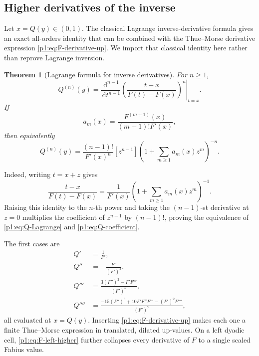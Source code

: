 \documentclass[11pt,oneside]{article}
\newtheorem{theorem}{Theorem}[section]
\theoremstyle{definition}
\theoremstyle{remark}
\newcommand{\dd}{\,\mathrm d}
\newcommand{\1}{\mathbf 1}
\begin{document}
\subsection{Higher derivatives of the inverse}
Let \(x=Q(y)\in(0,1)\).  The classical Lagrange inverse-derivative formula
\cite{p1:Comtet} gives an exact all-orders identity that can be combined with the
Thue--Morse derivative expression \eqref{p1:eq:F-derivative-up}.  We import that
classical identity here rather than reprove Lagrange inversion.

\begin{theorem}[Lagrange formula for inverse derivatives]\label{p1:thm:Q-derivatives}
For \(n\geq1\),
\begin{equation}
 \boxed{\quad
 Q^{(n)}(y)=
 \left.\frac{\dd^{n-1}}{\dd t^{n-1}}
 \left(\frac{t-x}{F(t)-F(x)}\right)^n\right|_{t=x}.
 \quad}                                                        \label{p1:eq:Q-Lagrange}
\end{equation}
If
\begin{equation}
 a_m(x)=\frac{F^{(m+1)}(x)}{(m+1)!F'(x)},                       \label{p1:eq:am-inverse}
\end{equation}
then equivalently
\begin{equation}
 Q^{(n)}(y)=\frac{(n-1)!}{F'(x)^n}
 [z^{n-1}]\left(1+\sum_{m\geq1}a_m(x)z^m\right)^{-n}.          \label{p1:eq:Q-coefficient}
\end{equation}
\end{theorem}

Indeed, writing \(t=x+z\) gives
\[
 \frac{t-x}{F(t)-F(x)}
 =\frac1{F'(x)}
 \left(1+\sum_{m\geq1}a_m(x)z^m\right)^{-1}.
\]
Raising this identity to the \(n\)-th power and taking the
\((n-1)\)-st derivative at \(z=0\) multiplies the coefficient of
\(z^{n-1}\) by \((n-1)!\), proving the equivalence of
\eqref{p1:eq:Q-Lagrange} and \eqref{p1:eq:Q-coefficient}.

The first cases are
\begin{align}
 Q'&=\frac1{F'},                                               \label{p1:eq:Q1}\\
 Q''&=-\frac{F''}{(F')^3},                                    \label{p1:eq:Q2}\\
 Q'''&=\frac{3(F'')^2-F'F'''}{(F')^5},                         \label{p1:eq:Q3}\\
 Q''''&=\frac{-15(F'')^3+10F'F''F'''-(F')^2F''''}{(F')^7},     \label{p1:eq:Q4}
\end{align}
all evaluated at \(x=Q(y)\).  Inserting \eqref{p1:eq:F-derivative-up} makes each
one a finite Thue--Morse expression in translated, dilated up-values.  On a
left dyadic cell, \eqref{p1:eq:F-left-higher} further collapses every derivative
of \(F\) to a single scaled Fabius value.
\end{document}
